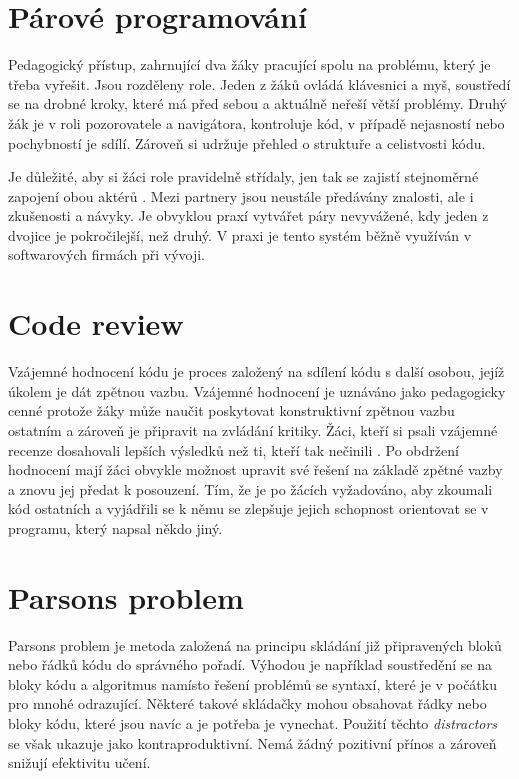 \documentclass[
  digital,     %
  oneside,     %
  nosansbold,  %
  colorbold, %
  lof,         %
  nolot,         %
]{fithesis4}
\begin{document}
\section{Párové programování}
Pedagogický přístup, zahrnující dva žáky pracující spolu na problému, který je třeba vyřešit. Jsou rozděleny role. Jeden z žáků ovládá klávesnici a myš, soustředí se na drobné kroky, které má před sebou a aktuálně neřeší větší problémy. Druhý žák je v roli pozorovatele a navigátora, kontroluje kód, v případě nejasností nebo pochybností je sdílí. Zároveň si udržuje přehled o struktuře a celistvosti kódu.

Je důležité, aby si žáci role pravidelně střídaly, jen tak se zajistí stejnoměrné zapojení obou aktérů \cite{Hanks11}. Mezi partnery jsou neustále předávány znalosti, ale i zkušenosti a návyky. Je obvyklou praxí vytvářet páry nevyvážené, kdy jeden z dvojice je pokročilejší, než druhý. V praxi je tento systém běžně využíván v softwarových firmách při vývoji.

\section{Code review}
Vzájemné hodnocení kódu je proces založený na sdílení kódu s další osobou, jejíž úkolem je dát zpětnou vazbu. Vzájemné hodnocení je uznáváno jako pedagogicky cenné protože žáky může naučit poskytovat konstruktivní zpětnou vazbu ostatním a zároveň je připravit na zvládání kritiky. Žáci, kteří si psali vzájemné recenze dosahovali lepších výsledků než ti, kteří tak nečinili \cite{Hundhausen13}. Po obdržení hodnocení mají žáci obvykle možnost upravit své řešení na základě zpětné vazby a znovu jej předat k posouzení. Tím, že je po žácích vyžadováno, aby zkoumali kód ostatních a vyjádřili se k němu se zlepšuje jejich schopnost orientovat se v programu, který napsal někdo jiný. 

%
\section{Parsons problem}
Parsons problem je metoda založená na principu skládání již připravených bloků nebo řádků kódu do správného pořadí. Výhodou je například soustředění se na bloky kódu a algoritmus namísto řešení problémů se syntaxí, které je v počátku pro mnohé odrazující. Některé takové skládačky mohou obsahovat řádky nebo bloky kódu, které jsou navíc a je potřeba je vynechat. Použití těchto \textit{distractors} se však ukazuje jako kontraproduktivní\cite{Harms16}. Nemá žádný pozitivní přínos a zároveň snižují efektivitu učení.
\end{document}
